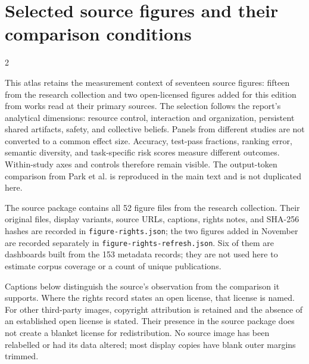 \clearpage
\section{Selected source figures and their comparison conditions}
\label{app:figure-atlas}
\setcounter{totalnumber}{4}\setcounter{topnumber}{3}\setcounter{bottomnumber}{2}
\renewcommand{\topfraction}{0.95}\renewcommand{\bottomfraction}{0.9}
\renewcommand{\textfraction}{0.05}\renewcommand{\floatpagefraction}{0.75}
\begin{multicols}{2}\raggedcolumns

This atlas retains the measurement context of seventeen source figures:
fifteen from the research collection and two open-licensed figures added for
this edition from works read at their primary sources. The selection follows
the report's analytical dimensions: resource control, interaction and
organization, persistent shared artifacts, safety, and collective beliefs. Panels from different studies are not converted to a
common effect size. Accuracy, test-pass fractions, ranking error, semantic
diversity, and task-specific risk scores measure different outcomes.
Within-study axes and controls therefore remain visible. The output-token
comparison from Park et al. is reproduced in the main text and is not
duplicated here.

The source package contains all 52 figure files from the research
collection. Their original files, display variants, source URLs, captions,
rights notes, and SHA-256 hashes are recorded in \texttt{figure-rights.json};
the two figures added in November are recorded separately in
\texttt{figure-rights-refresh.json}.
Six of them are dashboards built from the 153 metadata records; they are not
used here to estimate corpus coverage or a count of unique publications.

Captions below distinguish the source's observation from the comparison it
supports. Where the rights record states an open license, that
license is named. For other third-party images, copyright attribution is
retained and the absence of an established open license is stated. Their
presence in the source package does not create a blanket license for
redistribution. No source image has been relabelled or had its data altered;
most display copies have blank outer margins trimmed.
\end{multicols}

